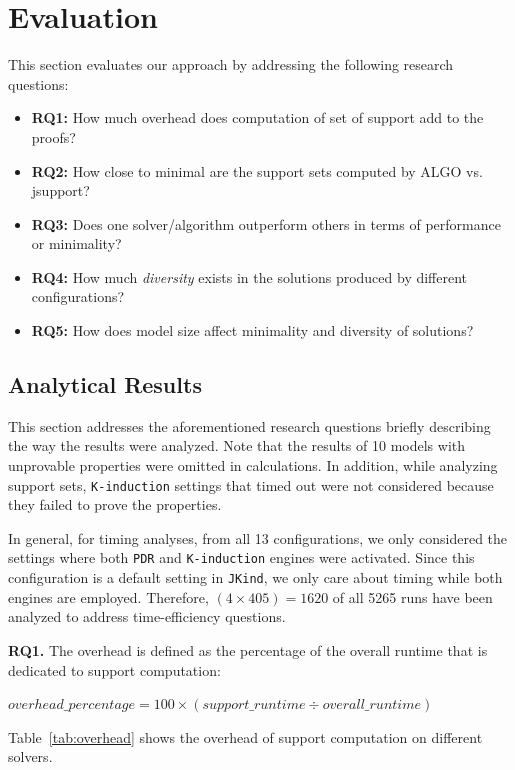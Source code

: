\section{Evaluation}
\label{sec:eval}
This section evaluates our approach by addressing the following research questions:
 
\begin{itemize}
    \item \textbf{RQ1:} How much overhead does computation of set of support add to the proofs?
    \item \textbf{RQ2:} How close to minimal are the support sets computed by ALGO vs. jsupport?
    \item \textbf{RQ3:} Does one solver/algorithm outperform others in terms of performance or minimality?
    \item \textbf{RQ4:} How much {\em diversity} exists in the solutions produced by different configurations?
    \item \textbf{RQ5:} How does model size affect minimality and diversity of solutions?
\end{itemize}

\subsection{Analytical Results}
\label{sec:res}
This section addresses the aforementioned research questions briefly describing the way the results were analyzed. Note that the results of 10 models with unprovable properties were omitted in calculations. In addition, while analyzing support sets, \texttt{K-induction} settings that timed out were not considered because they failed to prove the properties.

In general, for timing analyses, from all 13 configurations, we only considered the settings where both \texttt{PDR} and \texttt{K-induction} engines were activated. Since this configuration is a default setting in \texttt{JKind}, we only care about timing while both engines are employed. Therefore, $(4 \times 405) = 1620$ of all 5265 runs have been analyzed to address time-efficiency questions.


\textbf{RQ1.} The overhead is defined as the percentage of the overall runtime that is dedicated to support computation:

\mbox{$overhead\_percentage = 100 \times (support\_runtime \div overall\_runtime)$}

 Table~\ref{tab:overhead} shows the overhead of support computation on different solvers.



